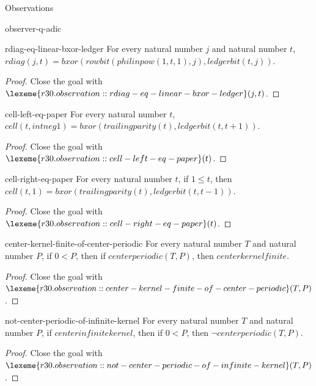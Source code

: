 \begin{lexlean}{Observations}
\begin{section}{observer-q-adic}
\begin{theorem}{rdiag-eq-linear-bxor-ledger}
For every natural number \(j\) and natural number \(t\), \(rdiag(j, t) = bxor(rowbit(philinpow(1, t, 1), j), ledgerbit(t, j))\).
\begin{proof}
Close the goal with \(\lexeme{r30.observation::rdiag-eq-linear-bxor-ledger}(j, t)\).
\end{proof}
\end{theorem}

\begin{theorem}{cell-left-eq-paper}
For every natural number \(t\), \(cell(t, intneg 1) = bxor(trailingparity(t), ledgerbit(t, t + 1))\).
\begin{proof}
Close the goal with \(\lexeme{r30.observation::cell-left-eq-paper}(t)\).
\end{proof}
\end{theorem}

\begin{theorem}{cell-right-eq-paper}
For every natural number \(t\), if \(1 ≤ t\), then \(cell(t, 1) = bxor(trailingparity(t), ledgerbit(t, t - 1))\).
\begin{proof}
Close the goal with \(\lexeme{r30.observation::cell-right-eq-paper}(t)\).
\end{proof}
\end{theorem}

\begin{theorem}{center-kernel-finite-of-center-periodic}
For every natural number \(T\) and natural number \(P\), if \(0 < P\), then if \(centerperiodic(T, P)\), then \(centerkernelfinite\).
\begin{proof}
Close the goal with \(\lexeme{r30.observation::center-kernel-finite-of-center-periodic}(T, P)\).
\end{proof}
\end{theorem}

\begin{theorem}{not-center-periodic-of-infinite-kernel}
For every natural number \(T\) and natural number \(P\), if \(centerinfinitekernel\), then if \(0 < P\), then \(¬ centerperiodic(T, P)\).
\begin{proof}
Close the goal with \(\lexeme{r30.observation::not-center-periodic-of-infinite-kernel}(T, P)\).
\end{proof}
\end{theorem}


\end{section}
\end{lexlean}
